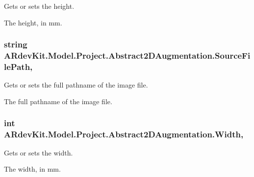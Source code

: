 Gets or sets the height. 

The height, in mm. \hypertarget{class_a_rdev_kit_1_1_model_1_1_project_1_1_abstract2_d_augmentation_af2c60054c5ff96c677c84f33c8cb5f9a}{
\subsubsection[{Source\-File\-Path}]{\setlength{\rightskip}{0pt plus 5cm}string A\-Rdev\-Kit.\-Model.\-Project.\-Abstract2\-D\-Augmentation.\-Source\-File\-Path\hspace{0.3cm}{\ttfamily [get]}, {\ttfamily [set]}}}\label{class_a_rdev_kit_1_1_model_1_1_project_1_1_abstract2_d_augmentation_af2c60054c5ff96c677c84f33c8cb5f9a}


Gets or sets the full pathname of the image file. 

The full pathname of the image file. \hypertarget{class_a_rdev_kit_1_1_model_1_1_project_1_1_abstract2_d_augmentation_abbc74c285b3d91be5841ce16473e2cd6}{
\subsubsection[{Width}]{\setlength{\rightskip}{0pt plus 5cm}int A\-Rdev\-Kit.\-Model.\-Project.\-Abstract2\-D\-Augmentation.\-Width\hspace{0.3cm}{\ttfamily [get]}, {\ttfamily [set]}}}\label{class_a_rdev_kit_1_1_model_1_1_project_1_1_abstract2_d_augmentation_abbc74c285b3d91be5841ce16473e2cd6}


Gets or sets the width. 

The width, in mm. 